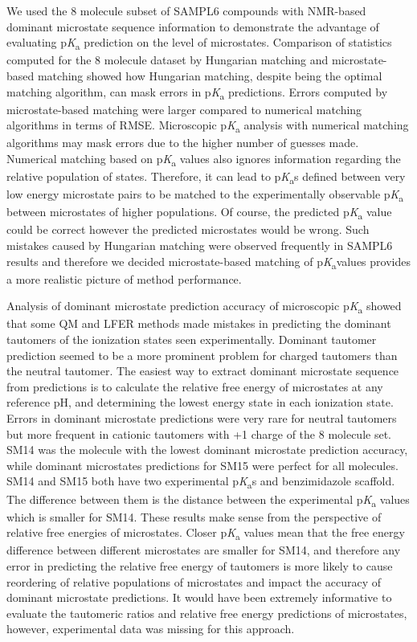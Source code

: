 \documentclass[9pt,lineno,final]{elife}
\newcommand{\pKa}{p\textit{K}\textsubscript{a}}
\begin{document}
We used the 8 molecule subset of SAMPL6 compounds with NMR-based dominant microstate sequence information to demonstrate the advantage of evaluating \pKa{} prediction on the level of microstates.
Comparison of statistics computed for the 8 molecule dataset by Hungarian matching and microstate-based matching showed how Hungarian matching, despite being the optimal matching algorithm, can mask errors in \pKa{} predictions. 
Errors computed by microstate-based matching were larger compared to numerical matching algorithms in terms of RMSE.
Microscopic \pKa{} analysis with numerical matching algorithms may mask errors due to the higher number of guesses made.
Numerical matching based on \pKa{} values also ignores information regarding the relative population of states. Therefore, it can lead to \pKa{}s defined between very low energy microstate pairs to be matched to the experimentally observable \pKa{} between microstates of higher populations. 
Of course, the predicted \pKa{} value could be correct however the predicted microstates would be wrong. Such mistakes caused by Hungarian matching were observed frequently in SAMPL6 results and therefore we decided microstate-based matching of \pKa values provides a more realistic picture of method performance.  

Analysis of dominant microstate prediction accuracy of microscopic \pKa{} showed that some QM and LFER methods made mistakes in predicting the dominant tautomers of the ionization states seen experimentally. Dominant tautomer prediction seemed to be a more prominent problem for charged tautomers than the neutral tautomer. The easiest way to extract dominant microstate sequence from predictions is to calculate the relative free energy of microstates at any reference pH, and determining the lowest energy state in each ionization state. Errors in dominant microstate predictions were very rare for neutral tautomers but more frequent in cationic tautomers with +1 charge of the 8 molecule set. SM14 was the molecule with the lowest dominant microstate prediction accuracy, while dominant microstates predictions for SM15 were perfect for all molecules. SM14 and SM15 both have two experimental \pKa{}s and benzimidazole scaffold. The difference between them is the distance between the experimental \pKa{} values which is smaller for SM14. These results make sense from the perspective of relative free energies of microstates. Closer \pKa{} values mean that the free energy difference between different microstates are smaller for SM14, and therefore any error in predicting the relative free energy of tautomers is more likely to cause reordering of relative populations of microstates and impact the accuracy of dominant microstate predictions. 
It would have been extremely informative to evaluate the tautomeric ratios and relative free energy predictions of microstates, however, experimental data was missing for this approach.
\end{document}

